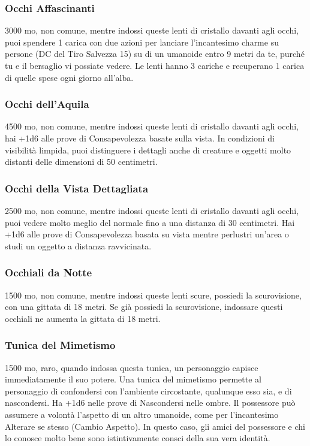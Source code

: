 \begin{multicols}{2}
\subsubsection*{Occhi Affascinanti}
3000 mo, non comune, mentre indossi queste lenti di cristallo davanti agli occhi, puoi spendere 1 carica con due azioni per lanciare l'incantesimo charme su persone (DC del Tiro Salvezza 15) su di un umanoide entro 9 metri da te, purché tu e il bersaglio vi possiate vedere. Le lenti hanno 3 cariche e recuperano 1 carica di quelle spese ogni giorno all'alba.

\subsubsection*{Occhi dell'Aquila}
4500 mo, non comune, mentre indossi queste lenti di cristallo davanti agli occhi, hai +1d6 alle prove di Consapevolezza basate sulla vista. In condizioni di visibilità limpida, puoi distinguere i dettagli anche di creature e oggetti molto distanti delle dimensioni di 50 centimetri.

\subsubsection*{Occhi della Vista Dettagliata}
2500 mo, non comune, mentre indossi queste lenti di cristallo davanti agli occhi, puoi vedere molto meglio del normale fino a una distanza di 30 centimetri. Hai +1d6 alle prove di Consapevolezza basata su vista mentre perlustri un'area o studi un oggetto a distanza ravvicinata.

\subsubsection*{Occhiali da Notte}
1500 mo, non comune, mentre indossi queste lenti scure, possiedi la scurovisione, con una gittata di 18 metri. Se già possiedi la scurovisione, indossare questi occhiali ne aumenta la gittata di 18 metri.

\subsubsection*{Tunica del Mimetismo}
1500 mo, raro, quando indossa questa tunica, un personaggio capisce immediatamente il suo potere. Una tunica del mimetismo permette al personaggio di confondersi con l’ambiente circostante, qualunque esso sia, e di nascondersi. Ha +1d6 nelle prove di Nascondersi nelle ombre. Il possessore può assumere a volontà l'aspetto di un altro umanoide, come per l'incantesimo Alterare se stesso (Cambio Aspetto). In questo caso, gli amici del possessore e chi lo conosce molto bene sono istintivamente consci della sua vera identità.


\end{multicols}
